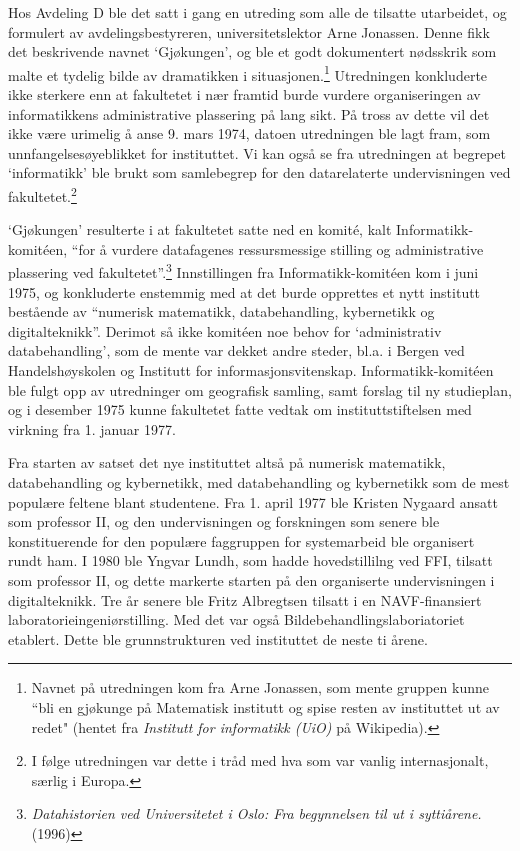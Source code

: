 Hos Avdeling D ble det satt i gang en utreding som alle de tilsatte utarbeidet, og formulert av avdelingsbestyreren, universitetslektor Arne Jonassen. Denne fikk det beskrivende navnet `Gjøkungen', og ble et godt dokumentert nødsskrik som malte et tydelig bilde av dramatikken i situasjonen.\footnote{Navnet på utredningen kom fra Arne Jonassen, som mente gruppen kunne ``bli en gjøkunge på Matematisk institutt og spise resten av instituttet ut av redet" (hentet fra \textit{Institutt for informatikk (UiO)} på Wikipedia).} Utredningen konkluderte ikke sterkere enn at fakultetet i nær framtid burde vurdere organiseringen av informatikkens administrative plassering på lang sikt. På tross av dette vil det ikke være urimelig å anse 9. mars 1974, datoen utredningen ble lagt fram, som unnfangelsesøyeblikket for instituttet. Vi kan også se fra utredningen at begrepet `informatikk' ble brukt som samlebegrep for den datarelaterte undervisningen ved fakultetet.\footnote{I følge utredningen var dette i tråd med hva som var vanlig internasjonalt, særlig i Europa.}

`Gjøkungen' resulterte i at fakultetet satte ned en komité, kalt Informatikk-komitéen, ``for å vurdere datafagenes ressursmessige stilling og administrative plassering ved fakultetet''.\footnote{\textit{Datahistorien ved Universitetet i Oslo: Fra begynnelsen til ut i syttiårene.} (1996)} Innstillingen fra Informatikk-komitéen kom i juni 1975, og konkluderte enstemmig med at det burde opprettes et nytt institutt bestående av ``numerisk matematikk, databehandling, kybernetikk og digitalteknikk''. Derimot så ikke komitéen noe behov for `administrativ databehandling', som de mente var dekket andre steder, bl.a. i Bergen ved Handelshøyskolen og Institutt for informasjonsvitenskap. Informatikk-komitéen ble fulgt opp av utredninger om geografisk samling, samt forslag til ny studieplan, og i desember 1975 kunne fakultetet fatte vedtak om instituttstiftelsen med virkning fra 1. januar 1977. 

Fra starten av satset det nye instituttet altså på numerisk matematikk, databehandling og kybernetikk, med databehandling og kybernetikk som de mest populære feltene blant studentene. Fra 1. april 1977 ble Kristen Nygaard ansatt som professor II, og den undervisningen og forskningen som senere ble konstituerende for den populære faggruppen for systemarbeid ble organisert rundt ham. I 1980 ble Yngvar Lundh, som hadde hovedstillilng ved FFI, tilsatt som professor II, og dette markerte starten på den organiserte undervisningen i digitalteknikk. Tre år senere ble Fritz Albregtsen tilsatt i en NAVF-finansiert laboratorieingeniørstilling. Med det var også Bildebehandlingslaboriatoriet etablert. Dette ble grunnstrukturen ved
instituttet de neste ti årene.

